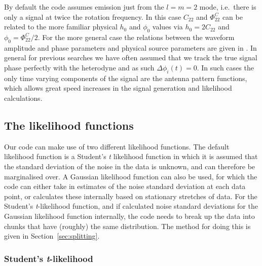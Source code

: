 By default the code assumes emission just from the $l=m=2$ mode, i.e.\ there is only a signal at twice the
rotation frequency. In this case $C_{22}$ and $\Phi_{22}^C$ can be related to the more familiar physical
$h_0$ and $\phi_0$ values via $h_0 = 2C_{22}$ and $\phi_0 = \Phi_{22}^C/2$. For the more general case the
relations between the waveform amplitude and phase parameters and physical source parameters are given in
\citet{2015arXiv150105832J}. In general for previous searches we have often assumed that we track the true
signal phase perfectly with the heterodyne and as such $\Delta\phi_i(t) = 0$. In such cases the only time
varying components of the signal are the antenna pattern functions, which allows great speed increases in the
signal generation and likelihood calculations.

\subsection{The likelihood functions}\label{sec:likelihood}

Our code can make use of two different likelihood functions. The default likelihood function is a
Student's {\it t} likelihood function in which it is assumed that the standard deviation of the noise in the
data is unknown, and can therefore be marginalised over. A Gaussian likelihood function can also be used, for
which the code can either take in estimates of the noise standard deviation at each data point, or calculates
these internally based on stationary stretches of data. For the Student's {\it t}-likelihood function, and if
calculated noise standard deviations for the Gaussian likelihood function internally, the code needs to break
up the data into chunks that have (roughly) the same distribution. The method for doing this is given in
Section~\ref{sec:splitting}.

\subsubsection{Student's {\it t}-likelihood}

